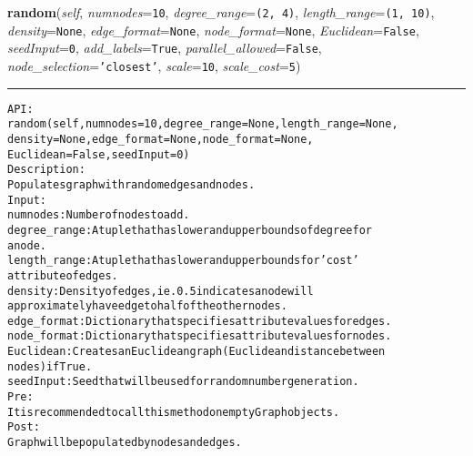 \hspace{.8\funcindent}\begin{boxedminipage}{\funcwidth}

    \raggedright \textbf{random}(\textit{self}, \textit{numnodes}={\tt 10}, \textit{degree\_range}={\tt \texttt{(}2\texttt{, }4\texttt{)}}, \textit{length\_range}={\tt \texttt{(}1\texttt{, }10\texttt{)}}, \textit{density}={\tt None}, \textit{edge\_format}={\tt None}, \textit{node\_format}={\tt None}, \textit{Euclidean}={\tt False}, \textit{seedInput}={\tt 0}, \textit{add\_labels}={\tt True}, \textit{parallel\_allowed}={\tt False}, \textit{node\_selection}={\tt \texttt{'}\texttt{closest}\texttt{'}}, \textit{scale}={\tt 10}, \textit{scale\_cost}={\tt 5})

    \vspace{-1.5ex}

    \rule{\textwidth}{0.5\fboxrule}
\setlength{\parskip}{2ex}
\begin{alltt}

API:
    random(self, numnodes = 10, degree\_range = None, length\_range = None,
       density = None, edge\_format = None, node\_format = None,
       Euclidean = False, seedInput = 0)
Description:
    Populates graph with random edges and nodes.
Input:
    numnodes: Number of nodes to add.
    degree\_range: A tuple that has lower and upper bounds of degree for
    a node.
    length\_range: A tuple that has lower and upper bounds for 'cost'
    attribute of edges.
    density: Density of edges, ie. 0.5 indicates a node will
    approximately have edge to half of the other nodes.
    edge\_format: Dictionary that specifies attribute values for edges.
    node\_format: Dictionary that specifies attribute values for nodes.
    Euclidean: Creates an Euclidean graph (Euclidean distance between
    nodes) if True.
    seedInput: Seed that will be used for random number generation.
Pre:
    It is recommended to call this method on empty Graph objects.
Post:
    Graph will be populated by nodes and edges.
\end{alltt}

\setlength{\parskip}{1ex}
    \end{boxedminipage}

    \label{coinor:gimpy:graph:Graph:relabel}

    \vspace{0.5ex}

